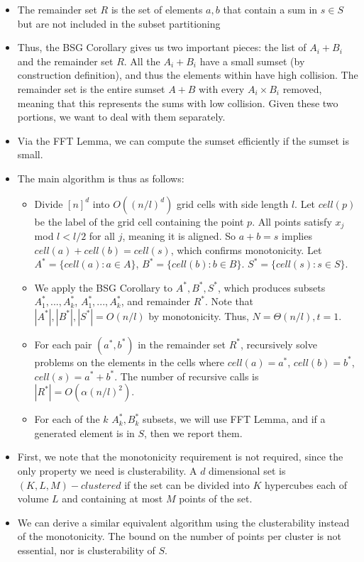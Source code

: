 \documentclass{article}
\begin{document}
\begin{itemize}
    \item The remainder set $R$ is the set of elements $a,b$ that contain a sum in $s \in S$ but are not included in the subset partitioning
    \item Thus, the BSG Corollary gives us two important pieces: the list of $A_i + B_i$ and the remainder set $R$. All the $A_i + B_i$ have a small sumset (by construction definition), and thus the elements within have high collision. The remainder set is the entire sumset $A+B$ with every $A_i \times B_i$ removed, meaning that this represents the sums with low collision. Given these two portions, we want to deal with them separately. 
    \item Via the FFT Lemma, we can compute the sumset efficiently if the sumset is small.
    \item The main algorithm is thus as follows:
    \begin{itemize}
        \item Divide $[n]^d$ into $O((n/l)^d)$ grid cells with side length $l$. Let $cell(p)$ be the label of the grid cell containing the point $p$. All points satisfy $x_j$ mod $l < l/2$ for all $j$, meaning it is aligned. So $a+b = s$ implies $cell(a)+cell(b) = cell(s)$, which confirms monotonicity. Let $A^* = \{cell(a): a \in A\}$, $B^* = \{cell(b): b \in B\}$. $S^* = \{cell(s): s \in S\}$.
        \item We apply the BSG Corollary to $A^*, B^*, S^*$, which produces subsets $A_1^*,...,A_k^*$, $A_1^*,...,A_k^*$, and remainder $R^*$. Note that $|A^*|, |B^*|, |S^*| = O(n/l)$ by monotonicity. Thus, $N = \Theta(n/l), t = 1$.
        \item For each pair $(a^*, b^*)$ in the remainder set $R^*$, recursively solve problems on the elements in the cells where $cell(a) = a^*$, $cell(b) = b^*$, $cell(s) = a^* + b^*$. The number of recursive calls is $|R^*| = O(\alpha(n/l)^2)$.
        \item For each of the $k$ $A_k^*, B_k^*$ subsets, we will use FFT Lemma, and if a generated element is in $S$, then we report them.
    \end{itemize}
    \item First, we note that the monotonicity requirement is not required, since the only property we need is clusterability. A $d$ dimensional set is $(K,L,M)-clustered$ if the set can be divided into $K$ hypercubes each of volume $L$ and containing at most $M$ points of the set.
    \item We can derive a similar equivalent algorithm using the clusterability instead of the monotonicity. The bound on the number of points per cluster is not essential, nor is clusterability of $S$.

\end{itemize}
\end{document}
